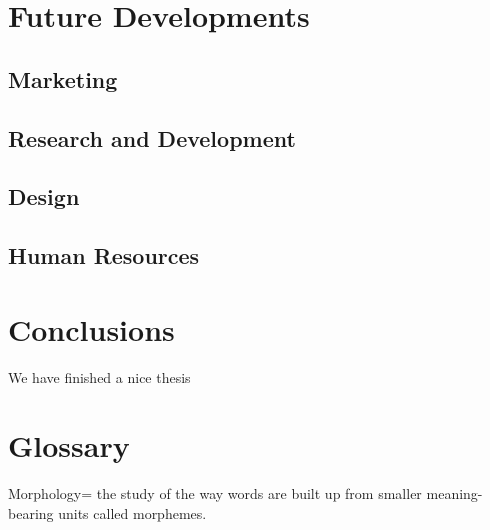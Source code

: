 \documentclass[]{book}
\begin{document}
\chapter{Future Developments}\label{future-developments}

\section{Marketing}\label{marketing-1}

\section{Research and Development}\label{research-and-development}

\section{Design}\label{design}

\section{Human Resources}\label{human-resources}

\chapter{Conclusions}\label{conclusions}

We have finished a nice thesis

\chapter{Glossary}\label{glossary}

Morphology= the study of the way words are built up from smaller
meaning-bearing units called morphemes.


\end{document}
